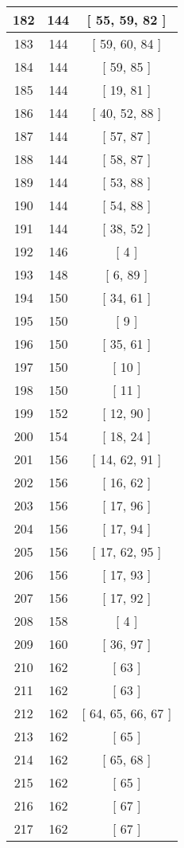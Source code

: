 \begin{center}
\begin{longtable}[H]{|| c c c ||}
\hline
182 & 144 & [ 55, 59, 82 ] \\ 
\hline
183 & 144 & [ 59, 60, 84 ] \\ 
\hline
184 & 144 & [ 59, 85 ] \\ 
\hline
185 & 144 & [ 19, 81 ] \\ 
\hline
186 & 144 & [ 40, 52, 88 ] \\ 
\hline
187 & 144 & [ 57, 87 ] \\ 
\hline
188 & 144 & [ 58, 87 ] \\ 
\hline
189 & 144 & [ 53, 88 ] \\ 
\hline
190 & 144 & [ 54, 88 ] \\ 
\hline
191 & 144 & [ 38, 52 ] \\ 
\hline
192 & 146 & [ 4 ] \\ 
\hline
193 & 148 & [ 6, 89 ] \\ 
\hline
194 & 150 & [ 34, 61 ] \\ 
\hline
195 & 150 & [ 9 ] \\ 
\hline
196 & 150 & [ 35, 61 ] \\ 
\hline
197 & 150 & [ 10 ] \\ 
\hline
198 & 150 & [ 11 ] \\ 
\hline
199 & 152 & [ 12, 90 ] \\ 
\hline
200 & 154 & [ 18, 24 ] \\ 
\hline
201 & 156 & [ 14, 62, 91 ] \\ 
\hline
202 & 156 & [ 16, 62 ] \\ 
\hline
203 & 156 & [ 17, 96 ] \\ 
\hline
204 & 156 & [ 17, 94 ] \\ 
\hline
205 & 156 & [ 17, 62, 95 ] \\ 
\hline
206 & 156 & [ 17, 93 ] \\ 
\hline
207 & 156 & [ 17, 92 ] \\ 
\hline
208 & 158 & [ 4 ] \\ 
\hline
209 & 160 & [ 36, 97 ] \\ 
\hline
210 & 162 & [ 63 ] \\ 
\hline
211 & 162 & [ 63 ] \\ 
\hline
212 & 162 & [ 64, 65, 66, 67 ] \\ 
\hline
213 & 162 & [ 65 ] \\ 
\hline
214 & 162 & [ 65, 68 ] \\ 
\hline
215 & 162 & [ 65 ] \\ 
\hline
216 & 162 & [ 67 ] \\ 
\hline
217 & 162 & [ 67 ] \\ 

\end{longtable}
\end{center}

